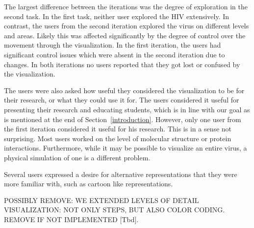 \documentclass[review,journal]{vgtc}         %
\begin{document}
The largest difference between the iterations was the degree of exploration in the second task. In the first task, neither user explored the HIV extensively. In contrast, the users from the second iteration explored the virus on different levels and areas. Likely this was affected significantly by the degree of control over the movement through the visualization. In the first iteration, the users had significant control issues which were absent in the second iteration due to changes. In both iterations no users reported that they got lost or confused by the visualization.

The users were also asked how useful they considered the visualization to be for their research, or what they could use it for. The users considered it useful for presenting their research and educating students, which is in line with our goal as is mentioned at the end of Section~\ref{introduction}. However, only one user from the first iteration considered it useful for his research. This is in a sense not surprising. Most users worked on the level of molecular structure or protein interactions. Furthermore, while it may be possible to visualize an entire virus, a physical simulation of one is a different problem. 


Several users expressed a desire for alternative representations that they were more familiar with, such as cartoon like representations.

POSSIBLY REMOVE: WE EXTENDED LEVELS OF DETAIL VISUALIZATION: NOT ONLY STEPS, BUT ALSO COLOR CODING. REMOVE IF NOT IMPLEMENTED [Tbd].






\end{document}
